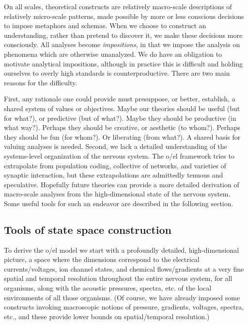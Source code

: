   On all scales, theoretical constructs are relatively macro-scale descriptions of relatively micro-scale patterns, made possible by more or less conscious decisions to impose metaphors and schemas. When we choose to construct an understanding, rather than pretend to discover it, we make these decisions more consciously. All analyses become \textit{impositions}, in that we impose the analysis on phenomena which are otherwise unanalyzed. We do have an obligation to motivate analytical impositions, although in practice this is difficult and holding ourselves to overly high standards is counterproductive. There are two main reasons for the difficulty. 

  First, any rationale one could provide must presuppose, or better, establish, a shared system of values or objectives. Maybe our theories should be useful (but for what?), or predictive (but of what?). Maybe they should be productive (in what way?). Perhaps they should be creative, or aesthetic (to whom?). Perhaps they should be fun (for whom?). Or liberating (from what?). A shared basis for valuing analyses is needed. Second, we lack a detailed understanding of the systems-level organization of the nervous system. The o/el framework tries to extrapolate from population coding, collective  of networks, and varieties of synaptic interaction, but these extrapolations are admittedly tenuous and speculative. Hopefully future theories can provide a more detailed derivation of macro-scale analyses from the high-di\-men\-sional state of the nervous system. Some useful tools for such an endeavor are described in the following section.

\subsection{Tools of state space construction}

To derive the o/el model we start with a profoundly detailed, high-di\-men\-sional picture, a space where the dimensions correspond to the electrical currents/voltages, ion channel states, and chemical flows/gradients at a very fine spatial and temporal resolution throughout the entire nervous system, for all organisms, along with the acoustic pressures, spectra, etc. of the local environments of all those organisms. (Of course, we have already imposed some constructs invoking macroscopic notions of pressure, gradients, voltages, spectra, etc., and these provide lower bounds on spatial/temporal resolution.) 

